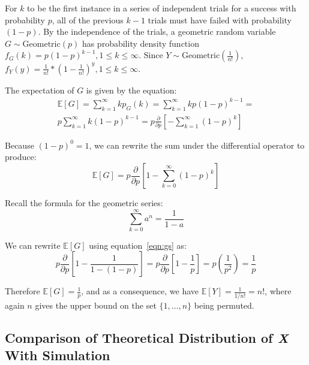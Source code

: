 \documentclass[11pt, oneside]{article}   	%
\begin{document}
For $k$ to be the first instance in a series of independent trials for a success with probability $p$, all of the previous $k - 1$ trials must have failed with probability $(1 - p)$. By the independence of the trials, a geometric random variable $G \sim \text{Geometric}(p)$ has probability density function $f_G(k) = p(1-p)^{k-1}, 1 \leq k \leq \infty$. Since $Y \sim \text{Geometric}(\frac{1}{n!})$, $f_Y(y) = \frac{1}{n!} * (1 - \frac{1}{n!})^y, 1 \leq k \leq \infty$.

The expectation of $G$ is given by the equation:
\begin{equation*}
\begin{split}
\mathbb{E}[G] =
\sum_{k = 1}^{\infty}k p_G(k) =
\sum_{k = 1}^{\infty}k p(1-p)^{k-1} =\\
p \sum_{k = 1}^{\infty}k (1 - p)^{k-1} =
p \frac{\partial}{\partial p} \left[-\sum_{k = 1}^{\infty}(1 - p)^k\right]
\end{split}
\end{equation*}

Because $(1-p)^{0} = 1$, we can rewrite the sum under the differential operator to produce:
\begin{equation*}
\mathbb{E}[G] = p \frac{\partial}{\partial p} \left[1 - \sum_{k = 0}^{\infty}(1 - p)^k\right]
\end{equation*}

Recall the formula for the geometric series:
\begin{equation}\label{eqn:gs}
\sum_{k = 0}^{\infty}a^n = \frac{1}{1-a}
\end{equation}

We can rewrite $\mathbb{E}[G]$ using equation~\ref{eqn:gs} as:
\begin{equation*}
p \frac{\partial}{\partial p} \left[1 - \frac{1}{1 - (1 - p)}\right] =
p \frac{\partial}{\partial p} \left[1 - \frac{1}{p}\right] =
p \left(\frac{1}{p^2}\right) =
\frac{1}{p}
\end{equation*}

Therefore $\mathbb{E}[G] = \frac{1}{p}$, and as a consequence, we have $\mathbb{E}[Y] = \frac{1}{1/n!} = n!$, where again $n$ gives the upper bound on the set $\{1, \dots, n\}$ being permuted.

\subsection{Comparison of Theoretical Distribution of \textit{X} With Simulation}
\end{document}

